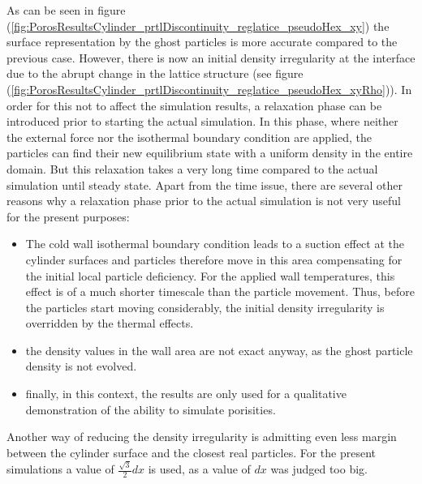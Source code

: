 \documentclass[11pt,a4paper,twoside]{report}
\begin{document}
As can be seen in figure (\ref{fig:PorosResultsCylinder_prtlDiscontinuity_reglatice_pseudoHex_xy}) the surface representation by the ghost particles is more accurate compared to the previous case. However, there is now an initial density irregularity at the interface due to the abrupt change in the lattice structure (see figure (\ref{fig:PorosResultsCylinder_prtlDiscontinuity_reglatice_pseudoHex_xyRho})). 
In order for this not to affect the simulation results, a relaxation phase can be introduced prior to starting the actual simulation. In this phase, where neither the external force nor the isothermal boundary condition are applied, the particles can find their new equilibrium state with a uniform density in the entire domain. But this relaxation takes a very long time compared to the actual simulation until steady state.
Apart from the time issue, there are several other reasons why a relaxation phase prior to the actual simulation is not very useful for the present purposes: 
\begin{itemize}
 \item 	The cold wall isothermal boundary condition leads to a suction effect at the cylinder surfaces and particles therefore move in this area compensating for the initial local particle deficiency. For the applied wall temperatures, this effect is of a much shorter timescale than the particle movement. Thus, before the particles start moving considerably, the initial density irregularity is overridden by the thermal effects.
\item the density values in the wall area are not exact anyway, as the ghost particle density is not evolved.
\item finally, in this context, the results are only used for a qualitative demonstration of the ability to simulate porisities.
\end{itemize}


Another way of reducing the density irregularity is admitting even less margin between the cylinder surface and the closest real particles. For the present simulations a value of $\frac{\sqrt{3}}{2}dx$ is used, as a value of $dx$ was judged too big.
\end{document}
